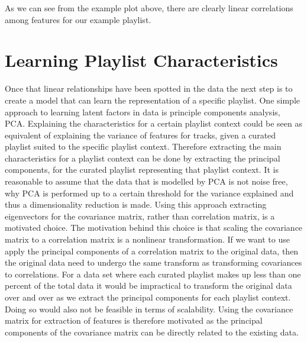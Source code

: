 \documentclass[a4paper,11pt]{kth-mag}
\begin{document}
As we can see from the example plot above, there are clearly linear correlations among features for our example playlist.

\section{Learning Playlist Characteristics}

Once that linear relationships have been spotted in the data the next step is to create a model that can learn the representation of a specific playlist. One simple approach to learning latent factors in data is principle components analysis, PCA.
Explaining the characteristics for a certain playlist context could be seen as equivalent of explaining the variance of features for tracks, given a curated playlist suited to the specific playlist context. Therefore extracting the main characteristics for a playlist context can be done by extracting the principal components, for the curated playlist representing that playlist context. It is reasonable to assume that the data that is modelled by PCA is not noise free, why PCA is performed up to a certain threshold for the variance explained and thus a dimensionality reduction is made. 
Using this approach extracting eigenvectors for the covariance matrix, rather than correlation matrix, is a motivated choice. The motivation behind this choice is that scaling the covariance matrix to a correlation matrix is a nonlinear transformation. If we want to use apply the principal components of a correlation matrix to the original data, then the original data need to undergo the same transform as transforming covariances to correlations. For a data set where each curated playlist makes up less than one percent of the total data it would be impractical to transform the original data over and over as we extract the principal components for each playlist context. Doing so would also not be feasible in terms of scalability. Using the covariance matrix for extraction of features is therefore motivated as the principal components of the covariance matrix can be directly related to the existing data.
\end{document}
